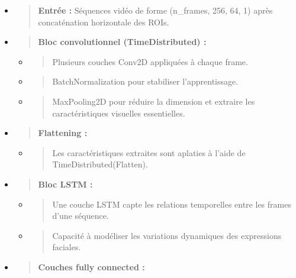 \documentclass[
]{article}
\begin{document}
\begin{itemize}
\item
  \begin{quote}
  \textbf{Entrée :} Séquences vidéo de forme (n\_frames, 256, 64, 1) après concaténation horizontale des ROIs.
  \end{quote}
\item
  \begin{quote}
  \textbf{Bloc convolutionnel (TimeDistributed) :\\
  }
  \end{quote}

  \begin{itemize}
  \item
    \begin{quote}
    Plusieurs couches Conv2D appliquées à chaque frame.
    \end{quote}
  \item
    \begin{quote}
    BatchNormalization pour stabiliser l'apprentissage.
    \end{quote}
  \item
    \begin{quote}
    MaxPooling2D pour réduire la dimension et extraire les caractéristiques visuelles essentielles.
    \end{quote}
  \end{itemize}
\item
  \begin{quote}
  \textbf{Flattening :\\
  }
  \end{quote}

  \begin{itemize}
  \item
    \begin{quote}
    Les caractéristiques extraites sont aplaties à l'aide de TimeDistributed(Flatten).
    \end{quote}
  \end{itemize}
\item
  \begin{quote}
  \textbf{Bloc LSTM :\\
  }
  \end{quote}

  \begin{itemize}
  \item
    \begin{quote}
    Une couche LSTM capte les relations temporelles entre les frames d'une séquence.
    \end{quote}
  \item
    \begin{quote}
    Capacité à modéliser les variations dynamiques des expressions faciales.
    \end{quote}
  \end{itemize}
\item
  \begin{quote}
  \textbf{Couches fully connected :\\
  }
  \end{quote}


\end{itemize}
\end{document}
